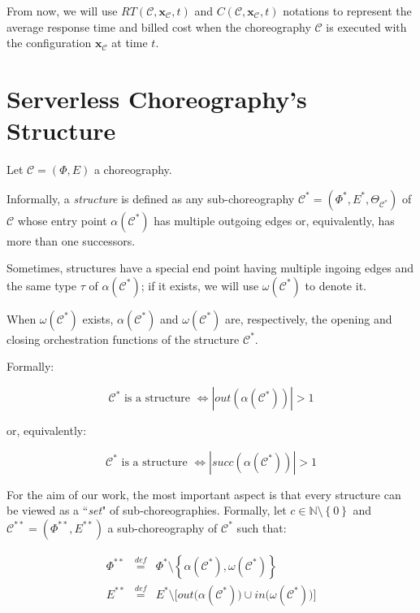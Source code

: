 \documentclass[12pt,a4paper]{report}
\newcommand{\mathDef}{\overset{\textit{def}}{=}}
\newcommand{\N}{\mathbb{N}}
\newcommand{\ItalicQuotMark}[1]{``\textit{#1}"}
\begin{document}
From now, we will use $RT(\mathcal{C},\textbf{x}_{\mathcal{C}}, t)$ and $C(\mathcal{C},\textbf{x}_{\mathcal{C}}, t)$ notations to represent the average response time and billed cost when the choreography $\mathcal{C}$ is executed with the configuration $\textbf{x}_{\mathcal{C}}$ at time $t$. 

\section{Serverless Choreography's Structure}

Let $\mathcal{C} = (\Phi,E)$ a choreography. 

Informally, a \textit{structure} is defined as any sub-choreography $\mathcal{C}^*= (\Phi^*,E^*,\Theta_{\mathcal{C}^*})$ of $\mathcal{C}$ whose entry point $\alpha(\mathcal{C}^*)$ has multiple outgoing edges or, equivalently, has more than one successors.

Sometimes, structures have a special end point having multiple ingoing edges and the same type $\tau$ of $\alpha(\mathcal{C}^*)$; if it exists, we will use $\omega(\mathcal{C}^*)$ to denote it.

When $\omega(\mathcal{C}^*)$ exists, $\alpha(\mathcal{C}^*)$ and $\omega(\mathcal{C}^*)$ are, respectively, the opening and closing orchestration functions of the structure $\mathcal{C}^*$. 

Formally:

\begin{equation}
	\mathcal{C}^* \text{ is a structure } \Leftrightarrow |out(\alpha(\mathcal{C}^*))| > 1
\end{equation}

or, equivalently:

\begin{equation}
	\mathcal{C}^* \text{ is a structure } \Leftrightarrow |succ(\alpha(\mathcal{C}^*))| > 1
\end{equation}

For the aim of our work, the most important aspect is that every structure can be viewed as a \ItalicQuotMark{set} of sub-choreographies. Formally, let $c \in \N \setminus \left\{0\right\}$ and $\mathcal{C}^{**} = (\Phi^{**},E^{**})$ a sub-choreography of $\mathcal{C}^*$ such that:

\begin{equation}
	\begin{array}{lll}
		\Phi^{**} & \mathDef & \Phi^* \setminus \left\lbrace \alpha(\mathcal{C}^*),\omega(\mathcal{C}^*) \right\rbrace   \\
		E^{**} & \mathDef & E^* \setminus \Big[ out \Big( \alpha(\mathcal{C}^*) \Big) \cup in \Big( \omega(\mathcal{C}^*) \Big) \Big]
	\end{array}
\end{equation}
\end{document}
